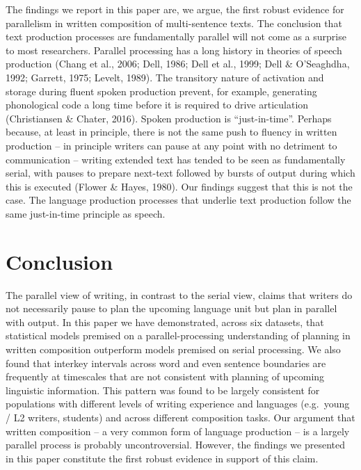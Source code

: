 \documentclass[
  man,floatsintext]{apa7}
\begin{document}
The findings we report in this paper are, we argue, the first robust evidence for parallelism in written composition of multi-sentence texts. The conclusion that text production processes are fundamentally parallel will not come as a surprise to most researchers. Parallel processing has a long history in theories of speech production (Chang et al., 2006; Dell, 1986; Dell et al., 1999; Dell \& O'Seaghdha, 1992; Garrett, 1975; Levelt, 1989). The transitory nature of activation and storage during fluent spoken production prevent, for example, generating phonological code a long time before it is required to drive articulation (Christiansen \& Chater, 2016). Spoken production is \enquote{just-in-time}. Perhaps because, at least in principle, there is not the same push to fluency in written production -- in principle writers can pause at any point with no detriment to communication -- writing extended text has tended to be seen as fundamentally serial, with pauses to prepare next-text followed by bursts of output during which this is executed (Flower \& Hayes, 1980). Our findings suggest that this is not the case. The language production processes that underlie text production follow the same just-in-time principle as speech.

\hypertarget{conclusion}{%
\section{Conclusion}\label{conclusion}}

The parallel view of writing, in contrast to the serial view, claims that writers do not necessarily pause to plan the upcoming language unit but plan in parallel with output. In this paper we have demonstrated, across six datasets, that statistical models premised on a parallel-processing understanding of planning in written composition outperform models premised on serial processing. We also found that interkey intervals across word and even sentence boundaries are frequently at timescales that are not consistent with planning of upcoming linguistic information. This pattern was found to be largely consistent for populations with different levels of writing experience and languages (e.g.~young / L2 writers, students) and across different composition tasks. Our argument that written composition -- a very common form of language production -- is a largely parallel process is probably uncontroversial. However, the findings we presented in this paper constitute the first robust evidence in support of this claim.
\end{document}
